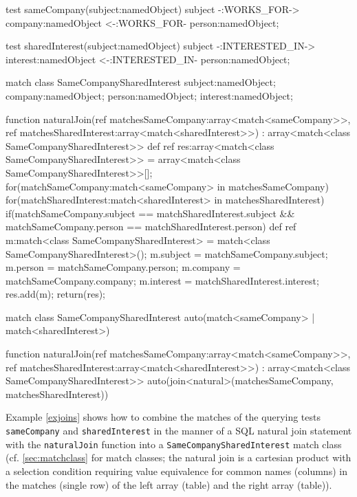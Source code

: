 \begin{example}
  \begin{grgen}
test sameCompany(subject:namedObject)
{
	subject -:WORKS_FOR-> company:namedObject <-:WORKS_FOR- person:namedObject;
}

test sharedInterest(subject:namedObject)
{
	subject -:INTERESTED_IN-> interest:namedObject <-:INTERESTED_IN- person:namedObject;
}

match class SameCompanySharedInterest
{
	subject:namedObject;
	company:namedObject;
	person:namedObject;
	interest:namedObject;
}

function naturalJoin(ref matchesSameCompany:array<match<sameCompany>>, ref matchesSharedInterest:array<match<sharedInterest>>) : array<match<class SameCompanySharedInterest>>
{
	def ref res:array<match<class SameCompanySharedInterest>> = array<match<class SameCompanySharedInterest>>[];
	for(matchSameCompany:match<sameCompany> in matchesSameCompany)
	{
		for(matchSharedInterest:match<sharedInterest> in matchesSharedInterest)
		{
			if(matchSameCompany.subject == matchSharedInterest.subject && matchSameCompany.person == matchSharedInterest.person) {
				def ref m:match<class SameCompanySharedInterest> = match<class SameCompanySharedInterest>();
				m.subject = matchSameCompany.subject;
				m.person = matchSameCompany.person;
				m.company = matchSameCompany.company;
				m.interest = matchSharedInterest.interest;
				res.add(m);
			}
		}
	}
	return(res);
}
  \end{grgen}\label{exjoins}
	
	\begin{grgen}
match class SameCompanySharedInterest
{
	auto(match<sameCompany> | match<sharedInterest>)
}

function naturalJoin(ref matchesSameCompany:array<match<sameCompany>>, ref matchesSharedInterest:array<match<sharedInterest>>) : array<match<class SameCompanySharedInterest>>
{
	auto(join<natural>(matchesSameCompany, matchesSharedInterest))
}
  \end{grgen}
\end{example}

Example \ref{exjoins} shows how to combine the matches of the querying tests \texttt{sameCompany} and \texttt{sharedInterest} in the manner of a SQL natural join statement with the \texttt{naturalJoin} function into a \texttt{SameCompanySharedInterest} match class (cf. \ref{sec:matchclass} for match classes; the natural join is a cartesian product with a selection condition requiring value equivalence for common names (columns) in the matches (single row) of the left array (table) and the right array (table)).

